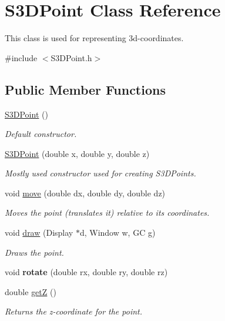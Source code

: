 \hypertarget{class_s3_d_point}{
\section{S3DPoint Class Reference}
\label{class_s3_d_point}
}


This class is used for representing 3d-\/coordinates.  




{\ttfamily \#include $<$S3DPoint.h$>$}

\subsection*{Public Member Functions}
\begin{DoxyCompactItemize}
\item 
\hyperlink{class_s3_d_point_adad5537c6692acccab628a6bc105d20e}{S3DPoint} ()
\begin{DoxyCompactList}\small\item\em Default constructor. \item\end{DoxyCompactList}\item 
\hyperlink{class_s3_d_point_ab03f0683b11340e8071eb8cdde1811b3}{S3DPoint} (double x, double y, double z)
\begin{DoxyCompactList}\small\item\em Mostly used constructor used for creating S3DPoints. \item\end{DoxyCompactList}\item 
void \hyperlink{class_s3_d_point_a18bbc742cbadc8d49d0600c3f80caf91}{move} (double dx, double dy, double dz)
\begin{DoxyCompactList}\small\item\em Moves the point (translates it) relative to its coordinates. \item\end{DoxyCompactList}\item 
void \hyperlink{class_s3_d_point_a59aee595c8ae9bfbb60915a09c06b0aa}{draw} (Display $\ast$d, Window w, GC g)
\begin{DoxyCompactList}\small\item\em Draws the point. \item\end{DoxyCompactList}\item 
\hypertarget{class_s3_d_point_a4d51ed60f8d2e7ee2edd060cfdef22d4}{
void {\bfseries rotate} (double rx, double ry, double rz)}
\label{class_s3_d_point_a4d51ed60f8d2e7ee2edd060cfdef22d4}

\item 
double \hyperlink{class_s3_d_point_a255a77e4ca340344be1b1bd6b6a3f418}{getZ} ()
\begin{DoxyCompactList}\small\item\em Returns the z-\/coordinate for the point. \item\end{DoxyCompactList}\end{DoxyCompactItemize}
